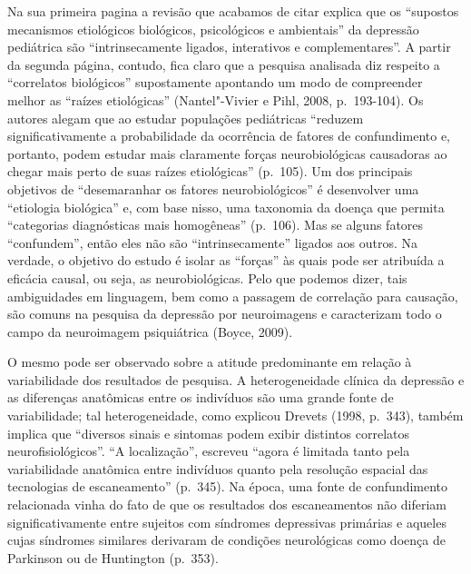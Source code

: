 Na sua primeira pagina a revisão que acabamos de citar explica que os
``supostos mecanismos etiológicos biológicos, psicológicos e
ambientais'' da depressão pediátrica são ``intrinsecamente ligados,
interativos e complementares''. A partir da segunda página, contudo,
fica claro que a pesquisa analisada diz respeito a ``correlatos
biológicos'' supostamente apontando um modo de compreender melhor as
``raízes etiológicas'' (Nantel"-Vivier e Pihl, 2008, p.~193-104). Os
autores alegam que ao estudar populações pediátricas ``reduzem
significativamente a probabilidade da ocorrência de fatores de
confundimento e, portanto, podem estudar mais claramente forças
neurobiológicas causadoras ao chegar mais perto de suas raízes
etiológicas'' (p.~105). Um dos principais objetivos de ``desemaranhar os
fatores neurobiológicos'' é desenvolver uma ``etiologia biológica'' e,
com base nisso, uma taxonomia da doença que permita ``categorias
diagnósticas mais homogêneas'' (p.~106). Mas se alguns fatores
``confundem'', então eles não são ``intrinsecamente'' ligados aos
outros. Na verdade, o objetivo do estudo é isolar as ``forças'' às quais
pode ser atribuída a eficácia causal, ou seja, as neurobiológicas. Pelo
que podemos dizer, tais ambiguidades em linguagem, bem como a passagem
de correlação para causação, são comuns na pesquisa da depressão por
neuroimagens e caracterizam todo o campo da neuroimagem psiquiátrica
(Boyce, 2009).

O mesmo pode ser observado sobre a atitude predominante em relação à
variabilidade dos resultados de pesquisa. A heterogeneidade clínica da
depressão e as diferenças anatômicas entre os indivíduos são uma grande
fonte de variabilidade; tal heterogeneidade, como explicou Drevets
(1998, p.~343), também implica que ``diversos sinais e sintomas podem
exibir distintos correlatos neurofisiológicos''. ``A localização'',
escreveu ``agora é limitada tanto pela variabilidade anatômica entre
indivíduos quanto pela resolução espacial das tecnologias de
escaneamento'' (p.~345). Na época, uma fonte de confundimento relacionada
vinha do fato de que os resultados dos escaneamentos não diferiam
significativamente entre sujeitos com síndromes depressivas primárias e
aqueles cujas síndromes similares derivaram de condições neurológicas
como doença de Parkinson ou de Huntington (p.~353).

